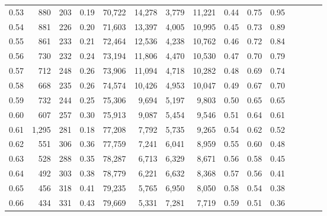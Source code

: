\begin{tabular}{rrrcrrrrrrrrrrr}
0.53 &    880 &  203 &                                       0.19 &  70,722 &  14,278 &   3,779 &  11,221 &  0.44 &  0.75 &                         0.95 \\
0.54 &    881 &  226 &                                       0.20 &  71,603 &  13,397 &   4,005 &  10,995 &  0.45 &  0.73 &                         0.89 \\
0.55 &    861 &  233 &                                       0.21 &  72,464 &  12,536 &   4,238 &  10,762 &  0.46 &  0.72 &                         0.84 \\
0.56 &    730 &  232 &                                       0.24 &  73,194 &  11,806 &   4,470 &  10,530 &  0.47 &  0.70 &                         0.79 \\
0.57 &    712 &  248 &                                       0.26 &  73,906 &  11,094 &   4,718 &  10,282 &  0.48 &  0.69 &                         0.74 \\
0.58 &    668 &  235 &                                       0.26 &  74,574 &  10,426 &   4,953 &  10,047 &  0.49 &  0.67 &                         0.70 \\
0.59 &    732 &  244 &                                       0.25 &  75,306 &   9,694 &   5,197 &   9,803 &  0.50 &  0.65 &                         0.65 \\
0.60 &    607 &  257 &                                       0.30 &  75,913 &   9,087 &   5,454 &   9,546 &  0.51 &  0.64 &                         0.61 \\
0.61 &  1,295 &  281 &                                       0.18 &  77,208 &   7,792 &   5,735 &   9,265 &  0.54 &  0.62 &                         0.52 \\
0.62 &    551 &  306 &                                       0.36 &  77,759 &   7,241 &   6,041 &   8,959 &  0.55 &  0.60 &                         0.48 \\
0.63 &    528 &  288 &                                       0.35 &  78,287 &   6,713 &   6,329 &   8,671 &  0.56 &  0.58 &                         0.45 \\
0.64 &    492 &  303 &                                       0.38 &  78,779 &   6,221 &   6,632 &   8,368 &  0.57 &  0.56 &                         0.41 \\
0.65 &    456 &  318 &                                       0.41 &  79,235 &   5,765 &   6,950 &   8,050 &  0.58 &  0.54 &                         0.38 \\
0.66 &    434 &  331 &                                       0.43 &  79,669 &   5,331 &   7,281 &   7,719 &  0.59 &  0.51 &                         0.36 \\

\end{tabular}
